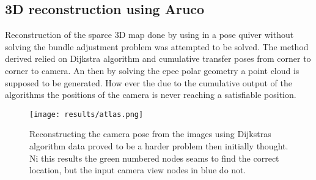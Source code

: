 \subsection{3D reconstruction using Aruco}%
Reconstruction of the sparce 3D map done by using  in a pose quiver without solving the bundle adjustment problem was attempted to be solved.
The method derived relied on Dijkstra algorithm and cumulative transfer poses from corner to corner to camera.
An then by solving the epee polar geometry a point cloud is supposed to be generated.
How ever the due to the cumulative output of the algorithms the positions of the camera is never reaching a satisfiable position.



\label{sub:res:3drec}
\begin{figure}
\begin{center}
    \texttt{[image: results/atlas.png]}
\end{center}
\caption[Results from camera mapping]{Reconstructing the camera pose from the images using Dijkstras algorithm  data proved to be a harder problem then initially thought. Ni this results the green numbered nodes seams to find the correct location, but the input camera view nodes in blue do not.}
\label{fig:results:mapreconstruction}
\end{figure}


